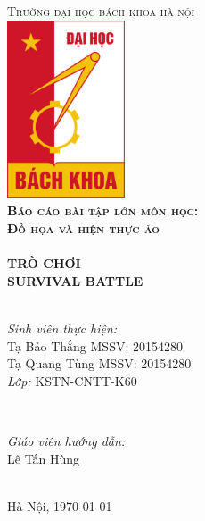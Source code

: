 \documentclass[../report.tex]{subfiles}
\begin{document}
\begin{titlepage}

\center
 
\textsc{\LARGE Trường đại học bách khoa hà nội}\\[1cm] %
\includegraphics[width=3.5cm]{figures/hust.jpg}\\[1cm] %
 
\textsc{\LARGE\bfseries Báo cáo bài tập lớn môn học:} \\[0.2cm]
\textsc{\huge\bfseries Đồ họa và hiện thực ảo}\\[1cm] %

\HRule \\[0.4cm]
{\LARGE\bfseries TRÒ CHƠI\\[4mm] SURVIVAL BATTLE}\\[0.3cm] %
\HRule \\[1.5cm]

\begin{minipage}{0.5\textwidth}
\begin{flushleft} \large
\emph{Sinh viên thực hiện:}\\
Tạ Bảo Thắng\hspace*{2mm} MSSV: 20154280 \\
Tạ Quang Tùng\hspace*{2mm} MSSV: 20154280 \\
\emph{Lớp:} KSTN-CNTT-K60
\end{flushleft}
\end{minipage}
~
\begin{minipage}{0.4\textwidth}
\begin{flushright} \large
\emph{Giáo viên hướng dẫn:} \\
Lê Tấn Hùng
\end{flushright}
\end{minipage}\\[3cm]

{\large Hà Nội, \today}\\[1cm] %

\vfill %

\end{titlepage}
\end{document}
